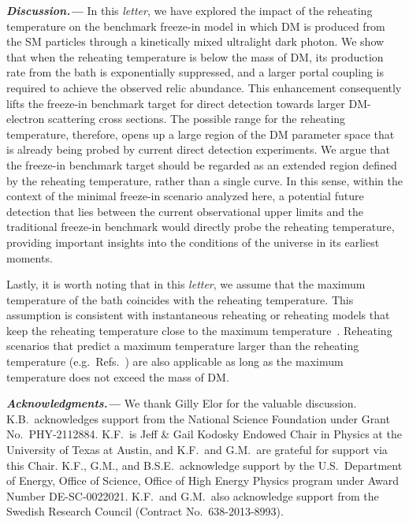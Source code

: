 \documentclass[notitlepage,nofootinbib,preprintnumbers,aps,superscriptaddress,twocolumn]{revtex4-1}
\begin{document}
\textbf{\textit{Discussion.---}}
In this \textit{letter}, we have explored the impact of the reheating temperature on the benchmark freeze-in model in which DM is produced from the SM particles through a kinetically mixed ultralight dark photon. We show that when the reheating temperature is below the mass of DM, its production rate from the bath is exponentially suppressed, and a larger portal coupling is required to achieve the observed relic abundance. This enhancement consequently lifts the freeze-in benchmark target for direct detection towards larger DM-electron scattering cross sections. The possible range for the reheating temperature, therefore, opens up a large region of the DM parameter space that is already being probed by current direct detection experiments. We argue that the freeze-in benchmark target should be regarded as an extended region defined by the reheating temperature, rather than a single curve.  In this sense, within the context of the minimal freeze-in scenario analyzed here, a potential future detection that lies between the current observational upper limits and the traditional freeze-in benchmark would directly probe the reheating temperature, providing important insights into the conditions of the universe in its earliest moments.

Lastly, it is worth noting that in this \textit{letter}, we assume that the maximum temperature of the bath coincides with the reheating temperature. This assumption is consistent with instantaneous reheating or reheating models that keep the reheating temperature close to the maximum temperature~\cite{Co:2020xaf,Cosme:2023xpa,Cosme:2024ndc, Barman:2024mqo}. Reheating scenarios that predict a maximum temperature larger than the reheating temperature (e.g.\ Refs.~\cite{Chung:1998rq,Giudice:2000ex,Kolb:2003ke}) are also applicable as long as the maximum temperature does not exceed the mass of DM.

\textit{\textbf{Acknowledgments.---}\label{sec:Acknowledgments}} 
We thank Gilly Elor for the valuable discussion. K.B.\ acknowledges support from the National Science Foundation under Grant No.~PHY-2112884.
K.F.\ is Jeff \& Gail Kodosky Endowed Chair in Physics at the University of Texas at Austin, and K.F.\ and G.M.\  are grateful for support via this Chair. K.F., G.M., and B.S.E.\  acknowledge support by the U.S.\ Department of Energy, Office of Science, Office of High Energy Physics program under Award Number DE-SC-0022021. K.F.\ and G.M.\ also acknowledge support from the Swedish Research Council (Contract No.~638-2013-8993).



\end{document}
